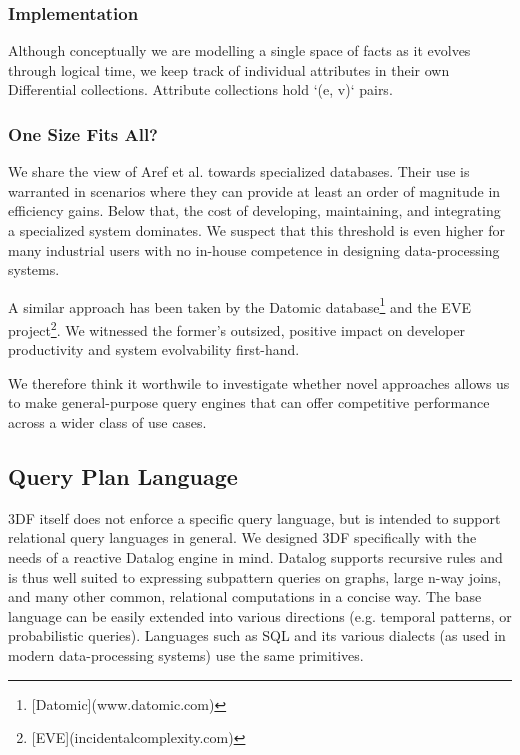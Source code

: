 \documentclass[../index.tex]{subfiles}
\begin{document}
\subsubsection{Implementation}

Although conceptually we are modelling a single space of facts as it
evolves through logical time, we keep track of individual attributes
in their own Differential collections. Attribute collections hold `(e,
v)` pairs.

\subsubsection{One Size Fits All?}

We share the view of Aref et al.\footnotemark[1]{} towards specialized
databases. Their use is warranted in scenarios where they can provide
at least an order of magnitude in efficiency gains. Below that, the
cost of developing, maintaining, and integrating a specialized system
dominates. We suspect that this threshold is even higher for many
industrial users with no in-house competence in designing
data-processing systems.

A similar approach has been taken by the Datomic database\footnote{[Datomic](www.datomic.com)} and the
EVE project\footnote{[EVE](incidentalcomplexity.com)}. We witnessed the former's outsized, positive impact on
developer productivity and system evolvability first-hand.

We therefore think it worthwile to investigate whether novel
approaches allows us to make general-purpose query engines that can
offer competitive performance across a wider class of use cases.

\subsection{Query Plan Language}

3DF itself does not enforce a specific query language, but is intended
to support relational query languages in general. We designed 3DF
specifically with the needs of a reactive Datalog engine in
mind. Datalog supports recursive rules and is thus well suited to
expressing subpattern queries on graphs, large n-way joins, and many
other common, relational computations in a concise way. The base
language can be easily extended into various directions (e.g. temporal
patterns, or probabilistic queries). Languages such as SQL and its
various dialects (as used in modern data-processing systems) use the
same primitives.
\end{document}
